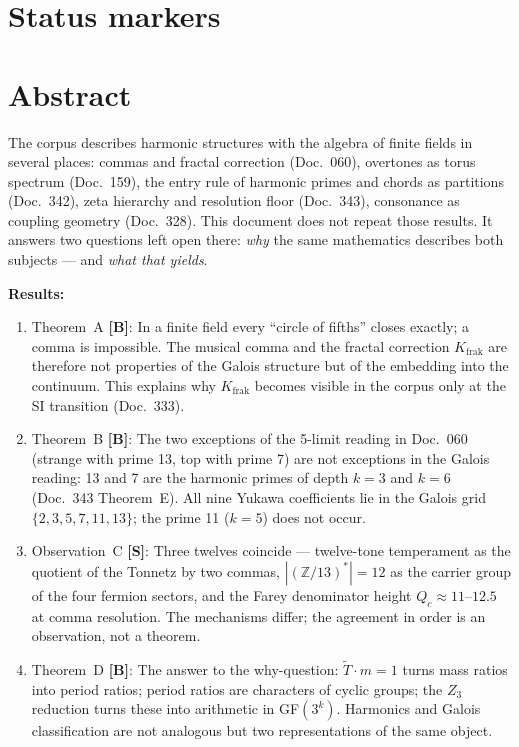 \providecommand{\BM}{\textbf{[B]}}
\providecommand{\KM}{\textbf{[K]}}
\providecommand{\SM}{\textbf{[S]}}
\providecommand{\XM}{\textbf{[X]}}
\providecommand{\QM}{\textbf{[Q]}}
\providecommand{\EM}{\textbf{[E]}}

{}

\section*{Status markers}


\section*{Abstract}

The corpus describes harmonic structures with the algebra of finite
fields in several places: commas and fractal correction (Doc.~060),
overtones as torus spectrum (Doc.~159), the entry rule of harmonic primes
and chords as partitions (Doc.~342), zeta hierarchy and resolution floor
(Doc.~343), consonance as coupling geometry (Doc.~328). This document does
not repeat those results. It answers two questions left open there:
\emph{why} the same mathematics describes both subjects --- and
\emph{what that yields}.

\textbf{Results:}
\begin{enumerate}
\item Theorem~A \BM: In a finite field every ``circle of fifths'' closes
  exactly; a comma is impossible. The musical comma and the fractal
  correction $K_\text{frak}$ are therefore not properties of the Galois
  structure but of the embedding into the continuum. This explains why
  $K_\text{frak}$ becomes visible in the corpus only at the SI transition
  (Doc.~333).
\item Theorem~B \BM: The two exceptions of the 5-limit reading in Doc.~060
  (strange with prime 13, top with prime 7) are not exceptions in the
  Galois reading: 13 and 7 are the harmonic primes of depth $k=3$ and
  $k=6$ (Doc.~343 Theorem~E). All nine Yukawa coefficients lie in the
  Galois grid $\{2,3,5,7,11,13\}$; the prime 11 ($k=5$) does not occur.
\item Observation~C \SM: Three twelves coincide --- twelve-tone
  temperament as the quotient of the Tonnetz by two commas,
  $|(\mathbb{Z}/13)^*|=12$ as the carrier group of the four fermion
  sectors, and the Farey denominator height $Q_c\approx11$--$12.5$ at
  comma resolution. The mechanisms differ; the agreement in order is an
  observation, not a theorem.
\item Theorem~D \BM: The answer to the why-question: $\tilde{T}\cdot m=1$
  turns mass ratios into period ratios; period ratios are characters of
  cyclic groups; the $Z_3$ reduction turns these into arithmetic in
  GF$(3^k)$. Harmonics and Galois classification are not analogous but
  two representations of the same object.
\end{enumerate}

